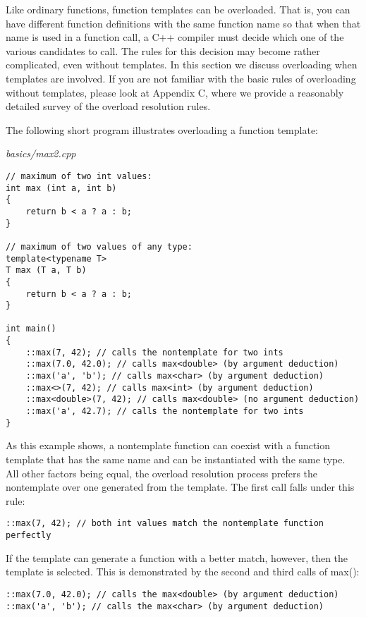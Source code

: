 Like ordinary functions, function templates can be overloaded. That is, you can have different function definitions with the same function name so that when that name is used in a function call, a C++ compiler must decide which one of the various candidates to call. The rules for this decision may become rather complicated, even without templates. In this section we discuss overloading when templates are involved. If you are not familiar with the basic rules of overloading without templates, please look at Appendix C, where we provide a reasonably detailed survey of the overload resolution rules.

The following short program illustrates overloading a function template:

\noindent
\textit{basics/max2.cpp}
\begin{lstlisting}[style=styleCXX]
// maximum of two int values:
int max (int a, int b)
{
	return b < a ? a : b;
}

// maximum of two values of any type:
template<typename T>
T max (T a, T b)
{
	return b < a ? a : b;
}

int main()
{
	::max(7, 42); // calls the nontemplate for two ints
	::max(7.0, 42.0); // calls max<double> (by argument deduction)
	::max('a', 'b'); // calls max<char> (by argument deduction)
	::max<>(7, 42); // calls max<int> (by argument deduction)
	::max<double>(7, 42); // calls max<double> (no argument deduction)
	::max('a', 42.7); // calls the nontemplate for two ints
}
\end{lstlisting}

As this example shows, a nontemplate function can coexist with a function template that has the same name and can be instantiated with the same type. All other factors being equal, the overload resolution process prefers the nontemplate over one generated from the template. The first call falls under this rule:

\begin{lstlisting}[style=styleCXX]
::max(7, 42); // both int values match the nontemplate function perfectly
\end{lstlisting}

If the template can generate a function with a better match, however, then the template is selected. This is demonstrated by the second and third calls of max():

\begin{lstlisting}[style=styleCXX]
::max(7.0, 42.0); // calls the max<double> (by argument deduction)
::max('a', 'b'); // calls the max<char> (by argument deduction)
\end{lstlisting}

